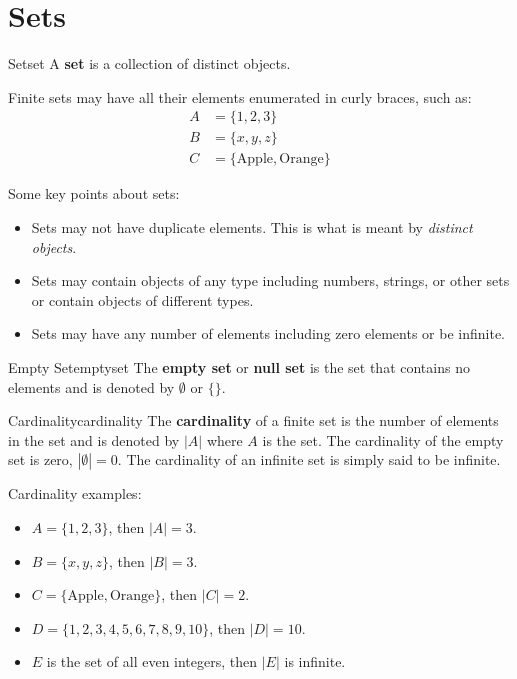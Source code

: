 \section{Sets}

\begin{definition}{Set}{set}
  A \textbf{set} is a collection of distinct objects.
\end{definition}

Finite sets may have all their elements enumerated in curly braces, such as:
\begin{align*}
  A &= \{ 1, 2, 3 \} \\
  B &= \{ x, y, z \} \\
  C &= \{ \text{Apple}, \text{Orange} \}
\end{align*}

Some key points about sets:
\begin{itemize}
  \item Sets may not have duplicate elements. This is what is meant by
  \emph{distinct objects}.
  \item Sets may contain objects of any type including numbers, strings, or other sets
   or contain objects of different types.
  \item Sets may have any number of elements including zero elements or be infinite.
\end{itemize}

\begin{definition}{Empty Set}{emptyset}
  The \textbf{empty set} or \textbf{null set} is the set that contains no elements
  and is denoted by \( \emptyset \) or \( \{ \} \).
\end{definition}

\begin{definition}{Cardinality}{cardinality}
  The \textbf{cardinality} of a finite set is the number of elements in the set and is
  denoted by \( |A| \) where \( A \) is the set. The cardinality of the empty
  set is zero, \( |\emptyset| = 0 \). The cardinality of an infinite set is simply said to be
  infinite.
\end{definition}

Cardinality examples:
\begin{itemize}
  \item \( A = \{ 1, 2, 3 \} \), then \( |A| = 3 \).
  \item \( B = \{ x, y, z \} \), then \( |B| = 3 \).
  \item \( C = \{ \text{Apple}, \text{Orange} \} \), then \( |C| = 2 \).
  \item \( D = \{ 1, 2, 3, 4, 5, 6, 7, 8, 9, 10 \} \), then \( |D| = 10 \).
  \item \( E \) is the set of all even integers, then \( |E| \) is infinite.
\end{itemize}

